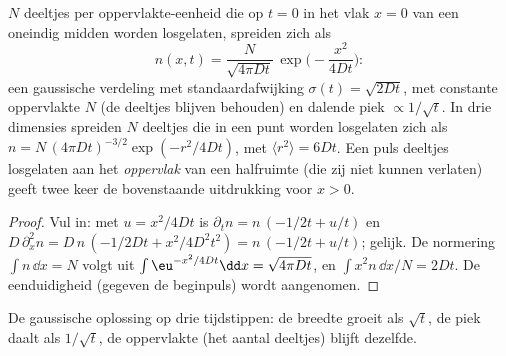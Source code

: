 \begin{proposition}\label{prop:b2:particle-diffusion:gaussian}
$N$ deeltjes per oppervlakte-eenheid die op $t = 0$ in het vlak $x = 0$ van
een oneindig midden worden losgelaten, spreiden zich als
\[
n(x,t) = \frac{N}{\sqrt{4\pi D t}}\,\exp\Big(-\frac{x^2}{4Dt}\Big) :
\]
een gaussische verdeling met standaardafwijking $\sigma(t) = \sqrt{2Dt}$,
met constante
oppervlakte $N$ (de deeltjes blijven behouden) en dalende piek
$\propto
1/\sqrt t$. In drie dimensies spreiden $N$ deeltjes die in een punt
worden losgelaten
zich als $n = N\,(4\pi Dt)^{-3/2}\exp(-r^2/4Dt)$, met
$\langle r^2
\rangle = 6Dt$. Een puls deeltjes losgelaten aan het
\emph{oppervlak} van
een halfruimte (die zij niet kunnen verlaten) geeft twee keer de
bovenstaande uitdrukking
voor $x > 0$.
\end{proposition}

\begin{proof}
Vul in: met $u = x^2/4Dt$ is $\partial_t n = n\,(-1/2t + u/t)$ en
$D\,\partial_x^2 n = D\,n\,(-1/2Dt + x^2/4D^2t^2) = n\,(-1/2t + u/t)$;
gelijk. De normering $\int n\,\dd x = N$ volgt uit
$\int
\eu^{-x^2/4Dt}\dd x = \sqrt{4\pi Dt}$, en $\int x^2 n\,\dd x/N = 2Dt$.
De eenduidigheid (gegeven de beginpuls) wordt aangenomen.
\end{proof}

\begin{omfigure}

{\small De gaussische oplossing op drie tijdstippen: de breedte groeit als
$\sqrt t$, de piek daalt als $1/\sqrt t$, de oppervlakte (het aantal
deeltjes) blijft dezelfde.}
\end{omfigure}

